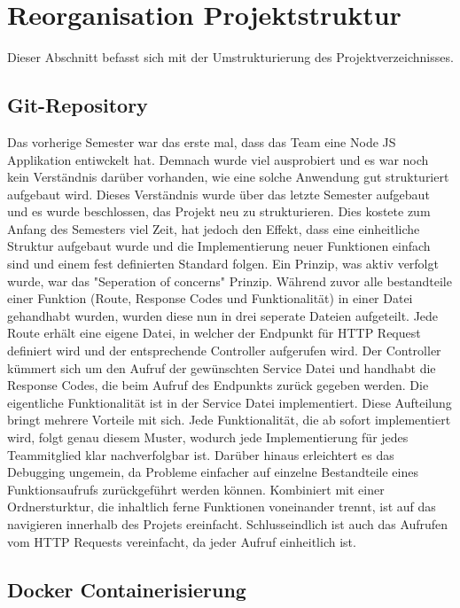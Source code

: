\section{Reorganisation Projektstruktur}\label{sec:section-two}

Dieser Abschnitt befasst sich mit der Umstrukturierung des Projektverzeichnisses.

\subsection{Git-Repository}\label{subsec:subsection-two-one}

Das vorherige Semester war das erste mal, dass das Team eine Node JS Applikation entiwckelt hat.
Demnach wurde viel ausprobiert und es war noch kein Verständnis darüber vorhanden, wie eine solche Anwendung gut strukturiert aufgebaut wird.
Dieses Verständnis wurde über das letzte Semester aufgebaut und es wurde beschlossen, das Projekt neu zu strukturieren.
Dies kostete zum Anfang des Semesters viel Zeit, hat jedoch den Effekt, dass eine einheitliche Struktur aufgebaut wurde und die Implementierung neuer Funktionen einfach sind und einem fest definierten Standard folgen.
Ein Prinzip, was aktiv verfolgt wurde, war das "Seperation of concerns" Prinzip.
Während zuvor alle bestandteile einer Funktion (Route, Response Codes und Funktionalität) in einer Datei gehandhabt wurden, wurden diese nun in drei seperate Dateien aufgeteilt.
Jede Route erhält eine eigene Datei, in welcher der Endpunkt für HTTP Request definiert wird und der entsprechende Controller aufgerufen wird.
Der Controller kümmert sich um den Aufruf der gewünschten Service Datei und handhabt die Response Codes, die beim Aufruf des Endpunkts zurück gegeben werden.
Die eigentliche Funktionalität ist in der Service Datei implementiert.
Diese Aufteilung bringt mehrere Vorteile mit sich.
Jede Funktionalität, die ab sofort implementiert wird, folgt genau diesem Muster, wodurch jede Implementierung für jedes Teammitglied klar nachverfolgbar ist.
Darüber hinaus erleichtert es das Debugging ungemein, da Probleme einfacher auf einzelne Bestandteile eines Funktionsaufrufs zurückgeführt werden können.
Kombiniert mit einer Ordnersturktur, die inhaltlich ferne Funktionen voneinander trennt, ist auf das navigieren innerhalb des Projets ereinfacht.
Schlusseindlich ist auch das Aufrufen vom HTTP Requests vereinfacht, da jeder Aufruf einheitlich ist.

\subsection{Docker Containerisierung}\label{subsec:docker-containerisierung}

